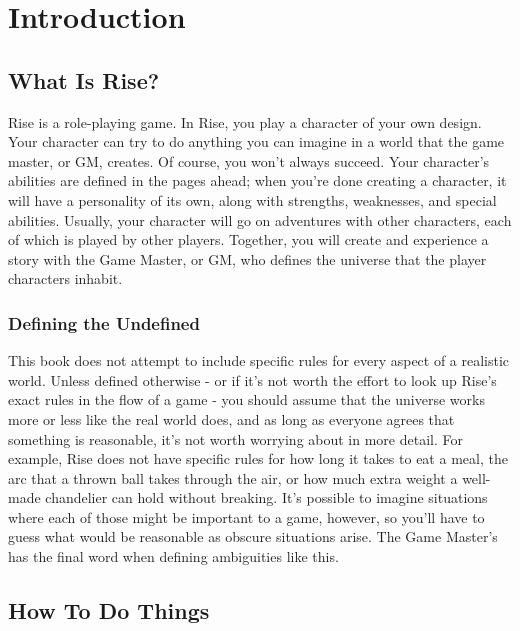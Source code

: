 \chapter{Introduction}

\section{What Is Rise?}
    Rise is a role-playing game.
    In Rise, you play a character of your own design.
    Your character can try to do anything you can imagine in a world that the game master, or GM, creates.
    Of course, you won't always succeed.
    Your character's abilities are defined in the pages ahead; when you're done creating a character, it will have a personality of its own, along with strengths, weaknesses, and special abilities.
    Usually, your character will go on adventures with other characters, each of which is played by other players.
    Together, you will create and experience a story with the Game Master, or GM, who defines the universe that the player characters inhabit.

    \subsection{Defining the Undefined}
        This book does not attempt to include specific rules for every aspect of a realistic world.
        Unless defined otherwise - or if it's not worth the effort to look up Rise's exact rules in the flow of a game - you should assume that the universe works more or less like the real world does, and as long as everyone agrees that something is reasonable, it's not worth worrying about in more detail.
        For example, Rise does not have specific rules for how long it takes to eat a meal, the arc that a thrown ball takes through the air, or how much extra weight a well-made chandelier can hold without breaking.
        It's possible to imagine situations where each of those might be important to a game, however, so you'll have to guess what would be reasonable as obscure situations arise.
        The Game Master's has the final word when defining ambiguities like this.

\section{How To Do Things}

